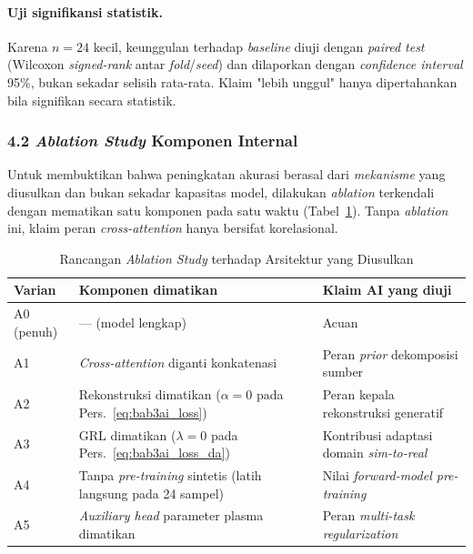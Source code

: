 \paragraph{Uji signifikansi statistik.} Karena $n=24$ kecil, keunggulan terhadap \textit{baseline} diuji dengan \textit{paired test} (Wilcoxon \textit{signed-rank} antar \textit{fold}/\textit{seed}) dan dilaporkan dengan \textit{confidence interval} 95\%, bukan sekadar selisih rata-rata. Klaim "lebih unggul" hanya dipertahankan bila signifikan secara statistik.

\subsubsection{4.2 \textit{Ablation Study} Komponen Internal}
Untuk membuktikan bahwa peningkatan akurasi berasal dari \emph{mekanisme} yang diusulkan dan bukan sekadar kapasitas model, dilakukan \textit{ablation} terkendali dengan mematikan satu komponen pada satu waktu (Tabel~\ref{tab:ai_ablation}). Tanpa \textit{ablation} ini, klaim peran \textit{cross-attention} hanya bersifat korelasional.

\begin{table}[H]
  \centering
  \caption{Rancangan \textit{Ablation Study} terhadap Arsitektur yang Diusulkan}
  \label{tab:ai_ablation}
  \small
  \begin{tabularx}{\textwidth}{|l|X|X|}
    \hline
    \textbf{Varian} & \textbf{Komponen dimatikan} & \textbf{Klaim AI yang diuji} \\ \hline
    A0 (penuh) & --- (model lengkap) & Acuan \\ \hline
    A1 & \textit{Cross-attention} diganti konkatenasi & Peran \textit{prior} dekomposisi sumber \\ \hline
    A2 & Rekonstruksi dimatikan ($\alpha=0$ pada Pers.~\ref{eq:bab3ai_loss}) & Peran kepala rekonstruksi generatif \\ \hline
    A3 & GRL dimatikan ($\lambda=0$ pada Pers.~\ref{eq:bab3ai_loss_da}) & Kontribusi adaptasi domain \textit{sim-to-real} \\ \hline
    A4 & Tanpa \textit{pre-training} sintetis (latih langsung pada 24 sampel) & Nilai \textit{forward-model pre-training} \\ \hline
    A5 & \textit{Auxiliary head} parameter plasma dimatikan & Peran \textit{multi-task regularization} \\ \hline
  \end{tabularx}
\end{table}


